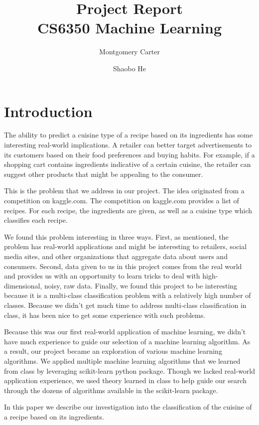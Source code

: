 \documentclass[11pt]{article}
\title{Project Report\\CS6350 Machine Learning}
\author{Montgomery Carter \and Shaobo He}
\begin{document}
\maketitle

\section{Introduction}
The ability to predict a cuisine type of a recipe based on its
ingredients has some interesting real-world implications.  A retailer
can better target advertisements to its customers based on their food
preferences and buying habits.  For example, if a shopping cart
contains ingredients indicative of a certain cuisine, the retailer can
suggest other products that might be appealing to the consumer.

This is the problem that we address in our project.  The idea
originated from a competition on kaggle.com\cite{kaggle-link}. The
competition on  kaggle.com provides a list of recipes.  For each
recipe, the ingredients are given, as well as a cuisine type which
classifies each recipe.

We found this problem interesting in three ways. First, as mentioned,
the problem has real-world applications and might be interesting to
retailers, social media sites, and other organizations that aggregate
data about users and consumers.  Second, data given to us in this
project comes from the real world and provides us with an opportunity
to learn tricks to deal with high-dimensional, noisy, raw data.
Finally, we found this project to be interesting because it is a
multi-class classification problem with a relatively high number of
classes.  Because we didn't get much time to address multi-class
classification in class, it has been nice to get some experience with
such problems. 

Because this was our first real-world application of machine learning,
we didn't have much experience to guide our selection of a machine
learning algorithm.  As a result, our project became an exploration of
various machine learning algorithms.  We applied multiple machine
learning algorithms that we learned from class by leveraging
scikit-learn python package. Though we lacked real-world application
experience, we used theory learned in class to help guide our search
through the dozens of algorithms available in the scikit-learn
package.

In this paper we describe our investigation into the classification of
the cuisine of a recipe based on its ingredients.
\end{document}
